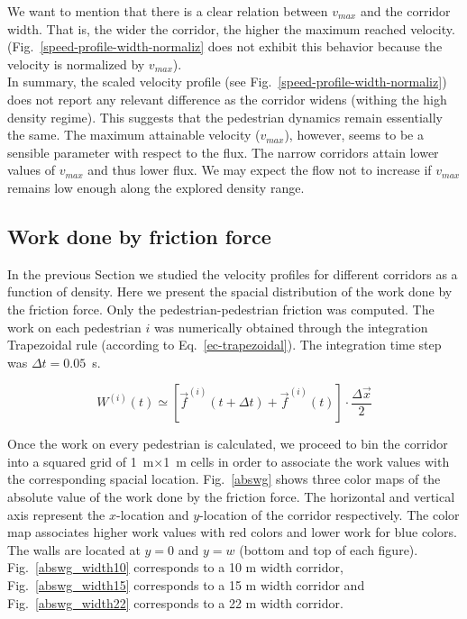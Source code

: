 \documentclass[preprint,12pt]{elsarticle}
\begin{document}
We want to mention that there is a clear relation between $v_{max}$ and the corridor width. That is, the wider the corridor, the higher the maximum reached velocity. (Fig.~\ref{speed-profile-width-normaliz} does not exhibit this behavior because the velocity is normalized by $v_{max}$).\\

In summary, the scaled velocity profile (see Fig.~\ref{speed-profile-width-normaliz}) does not report any relevant difference as the corridor widens (withing the high density regime). This suggests that the pedestrian dynamics remain essentially the same. The maximum attainable velocity ($v_{max}$), however, seems to be a sensible parameter with respect to the flux.  The narrow corridors attain lower values of $v_{max}$ and thus lower flux. We may expect the flow not to increase if $v_{max}$ remains low enough along the explored density range.\\

\subsection{Work done by friction force}

In the previous Section we studied the velocity profiles for different corridors as a function of density. Here we present the spacial distribution of the work done by the friction force. Only the pedestrian-pedestrian friction was computed.
The work on each pedestrian $i$ was numerically obtained through the integration Trapezoidal rule (according to Eq.~\ref{ec-trapezoidal}). The integration time step was $\Delta t = 0.05$~s. 

\begin{equation}
W^{(i)}(t) \simeq \left [ \vec{f}^{(i)}(t+\Delta t) + \vec{f}^{(i)}(t)  \right ]\cdot \frac{\Delta \vec{x}}{2} \label{ec-trapezoidal}
\end{equation}

Once the work on every pedestrian is calculated, we proceed to bin the corridor into a squared grid of 1~m$\times$1~m cells in order to associate the work values with the corresponding spacial location. Fig.~\ref{abswg} shows three color maps of the absolute value of the work done by the friction force. The horizontal and vertical axis represent the $x$-location and $y$-location of the corridor respectively. The color map associates higher work values with red colors and lower work for blue colors. The walls are located at $y=0$ and $y=w$ (bottom and top of each figure). Fig.~\ref{abswg_width10} corresponds to a 10 m width corridor, Fig.~\ref{abswg_width15} corresponds to a 15 m width corridor and Fig.~\ref{abswg_width22} corresponds to a 22 m width corridor.\\
\end{document}

